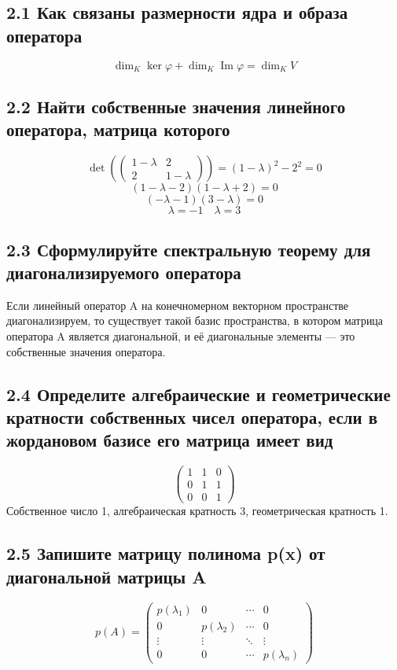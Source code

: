 \documentclass{article}
\begin{document}
\subsection*{2.1 Как связаны размерности ядра и образа оператора}
\[\dim_K \ker \varphi + \dim_K \operatorname{Im} \varphi = \dim_K V\]

\subsection*{2.2 Найти собственные значения линейного оператора, матрица которого}
\[\det\left(\begin{pmatrix}
1-\lambda & 2 \\
2 & 1-\lambda
\end{pmatrix}\right) = (1-\lambda)^2 - 2^2 = 0\]
\[(1-\lambda-2)(1-\lambda+2) = 0\]
\[(-\lambda-1)(3-\lambda) = 0\]
\[\lambda = -1 \quad \lambda = 3\]

\subsection*{2.3 Сформулируйте спектральную теорему для диагонализируемого оператора}
Если линейный оператор A на конечномерном векторном пространстве диагонализируем, то существует такой базис пространства, в котором матрица оператора A является диагональной, и её диагональные элементы — это собственные значения оператора.

\subsection*{2.4 Определите алгебраические и геометрические кратности собственных чисел оператора, если в жордановом базисе его матрица имеет вид}
\[\left(\begin{array}{ccc}
1 & 1 & 0 \\
0 & 1 & 1 \\
0 & 0 & 1
\end{array}\right)\]
Собственное число 1, алгебраическая кратность 3, геометрическая кратность 1.

\subsection*{2.5 Запишите матрицу полинома p(x) от диагональной матрицы A}
\[p(A) = \left(\begin{array}{cccc}
p(\lambda_1) & 0 & \cdots & 0 \\
0 & p(\lambda_2) & \cdots & 0 \\
\vdots & \vdots & \ddots & \vdots \\
0 & 0 & \cdots & p(\lambda_n)
\end{array}\right)\]
\end{document}
